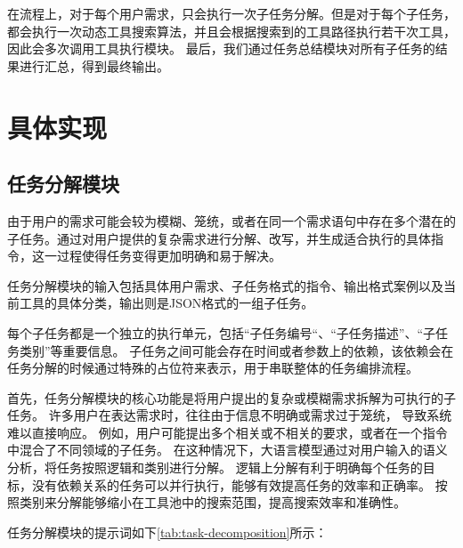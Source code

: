 在流程上，对于每个用户需求，只会执行一次子任务分解。但是对于每个子任务，都会执行一次动态工具搜索算法，并且会根据搜索到的工具路径执行若干次工具，因此会多次调用工具执行模块。
最后，我们通过任务总结模块对所有子任务的结果进行汇总，得到最终输出。

\section{具体实现}

\subsection{任务分解模块}

由于用户的需求可能会较为模糊、笼统，或者在同一个需求语句中存在多个潜在的子任务。通过对用户提供的复杂需求进行分解、改写，并生成适合执行的具体指令，这一过程使得任务变得更加明确和易于解决。

任务分解模块的输入包括具体用户需求、子任务格式的指令、输出格式案例以及当前工具的具体分类，输出则是JSON格式的一组子任务。

每个子任务都是一个独立的执行单元，包括“子任务编号“、“子任务描述”、“子任务类别”等重要信息。
子任务之间可能会存在时间或者参数上的依赖，该依赖会在任务分解的时候通过特殊的占位符来表示，用于串联整体的任务编排流程。

首先，任务分解模块的核心功能是将用户提出的复杂或模糊需求拆解为可执行的子任务。
许多用户在表达需求时，往往由于信息不明确或需求过于笼统，
导致系统难以直接响应。
例如，用户可能提出多个相关或不相关的要求，或者在一个指令中混合了不同领域的子任务。
在这种情况下，大语言模型通过对用户输入的语义分析，将任务按照逻辑和类别进行分解。
逻辑上分解有利于明确每个任务的目标，没有依赖关系的任务可以并行执行，能够有效提高任务的效率和正确率。
按照类别来分解能够缩小在工具池中的搜索范围，提高搜索效率和准确性。

任务分解模块的提示词如下\ref{tab:task-decomposition}所示：


